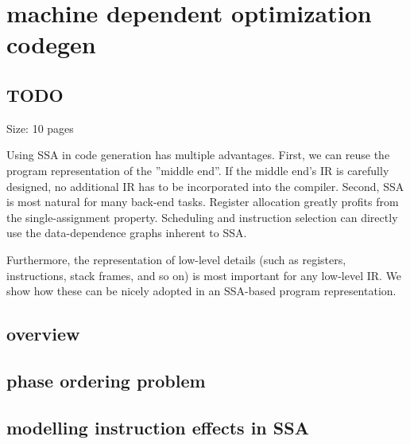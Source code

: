 \applynumberofpages\chapter{machine dependent optimization codegen }
\section{TODO}


Size: 10 pages

Using SSA in code generation has multiple advantages.
First, we can reuse the program representation of the ''middle end''.
If the middle end's IR is carefully designed, no additional IR has to be incorporated into the compiler.
Second, SSA is most natural for many back-end tasks.
Register allocation greatly profits from the single-assignment property.
Scheduling and instruction selection can directly use the data-dependence graphs inherent to SSA.

Furthermore, the representation of low-level details (such as registers, instructions, stack frames, and so on) is most important for any low-level IR.
We show how these can be nicely adopted in an SSA-based program representation.

\section{overview}
\section{phase ordering problem}
\section{modelling instruction effects in SSA}
